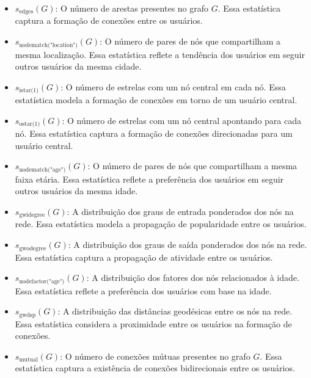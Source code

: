 \begin{itemize}
	\item $s_{\text{edges}}(G)$: O número de arestas presentes no grafo $G$. Essa estatística captura a formação de conexões entre os usuários.

	\item $s_{\text{nodematch("location")}}(G)$: O número de pares de nós que compartilham a mesma localização. Essa estatística reflete a tendência dos usuários em seguir outros usuários da mesma cidade.

	\item $s_{\text{istar(1)}}(G)$: O número de estrelas com um nó central em cada nó. Essa estatística modela a formação de conexões em torno de um usuário central.

	\item $s_{\text{ostar(1)}}(G)$: O número de estrelas com um nó central apontando para cada nó. Essa estatística captura a formação de conexões direcionadas para um usuário central.

	\item $s_{\text{nodematch("age")}}(G)$: O número de pares de nós que compartilham a mesma faixa etária. Essa estatística reflete a preferência dos usuários em seguir outros usuários da mesma idade.

	\item $s_{\text{gwidegree}}(G)$: A distribuição dos graus de entrada ponderados dos nós na rede. Essa estatística modela a propagação de popularidade entre os usuários.

	\item $s_{\text{gwodegree}}(G)$: A distribuição dos graus de saída ponderados dos nós na rede. Essa estatística captura a propagação de atividade entre os usuários.

	\item $s_{\text{nodefactor("age")}}(G)$: A distribuição dos fatores dos nós relacionados à idade. Essa estatística reflete a preferência dos usuários com base na idade.

	\item $s_{\text{gwdsp}}(G)$: A distribuição das distâncias geodésicas entre os nós na rede. Essa estatística considera a proximidade entre os usuários na formação de conexões.

	\item $s_{\text{mutual}}(G)$: O número de conexões mútuas presentes no grafo $G$. Essa estatística captura a existência de conexões bidirecionais entre os usuários.
\end{itemize}

